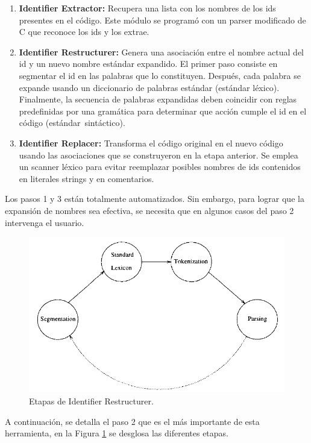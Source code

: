 \documentclass[a4paper,12pt]{report}
\begin{document}
\begin{enumerate}
\itemsep0em%
\item \textbf{Identifier Extractor:} Recupera una lista con los nombres de los ids presentes en el código. Este módulo se programó con un parser modificado de C que reconoce los ids y los extrae.
\item \textbf{Identifier Restructurer:} Genera una asociación entre el nombre actual del id y un nuevo nombre estándar expandido. El primer paso consiste en segmentar el id en las palabras que lo constituyen. Después, cada palabra se expande usando un diccionario de palabras estándar (estándar léxico). Finalmente, la secuencia de palabras expandidas deben coincidir con reglas predefinidas por una gramática para determinar que acción cumple el id en el código \mbox{(estándar sintáctico).}
\item \textbf{Identifier Replacer:} Transforma el código original en el nuevo código usando las asociaciones que se construyeron en la etapa anterior. Se emplea un scanner léxico para evitar reemplazar posibles nombres de ids contenidos en literales strings y en comentarios.
\end{enumerate}

Los pasos 1 y 3 están totalmente automatizados. Sin embargo, para lograr que la expansión de nombres sea efectiva, se necesita que en algunos casos del paso 2 intervenga el usuario.

\begin{figure}[h] %
\centering
\includegraphics[scale= 0.60]{./ire_2.png}
\caption{Etapas de Identifier Restructurer.}
\label{ire2}
\end{figure}

A continuación, se detalla el paso 2 que es el más importante de esta herramienta, en la Figura \ref{ire2} se desglosa las diferentes etapas.
\end{document}
